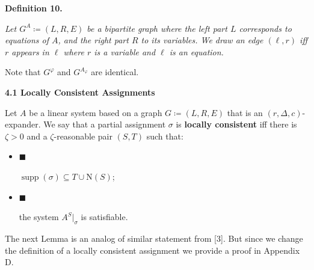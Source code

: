 

\par\medskip\noindent\textbf{
\textbf{Definition 10}\textbf{.}
}\par



\emph{Let $G^{A}\coloneqq(L,R,E)$ be a bipartite graph where the left part $L$ corresponds to equations
of $A$, and the right part $R$ to its variables. We draw an edge $(\ell,r)$ iff $r$ appears in
$\ell$ where $r$ is a variable and $\ell$ is an equation.}\par






Note that $G^{\varphi}$ and $G^{A_{\varphi}}$ are identical.\par




\par\medskip\noindent\textbf{
4.1 Locally Consistent Assignments}\par




Let $A$ be a linear system based on a graph $G\coloneqq(L,R,E)$ that is an $(r,\Delta,c)$-expander. We say that a partial assignment $\sigma$ is \textbf{locally consistent} iff there is
$\zeta>0$ and a $\zeta$-reasonable pair $(S,T)$ such that:\par


\begin{itemize}


\item[] 
$\blacksquare$ 


$\operatorname*{supp}(\sigma)\subseteq T\cup\mathrm{N}\left(S\right)$;\par





\item[] 
$\blacksquare$ 


the system $A^{S}|_{\sigma}$ is satisfiable.\par





\end{itemize}




The next Lemma is an analog of similar statement from [3]. But since we change the
definition of a locally consistent assignment we provide a proof in Appendix
D.\par



